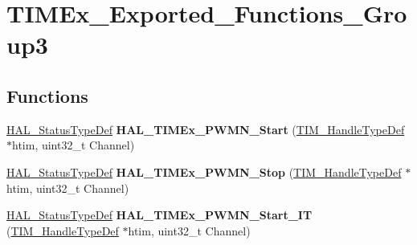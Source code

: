 \hypertarget{group___t_i_m_ex___exported___functions___group3}{}\section{T\+I\+M\+Ex\+\_\+\+Exported\+\_\+\+Functions\+\_\+\+Group3}
\label{group___t_i_m_ex___exported___functions___group3}
\subsection*{Functions}
\begin{DoxyCompactItemize}
\item 
\mbox{\label{group___t_i_m_ex___exported___functions___group3_ga4f2b0bb4b66a5acd76eac4e8d32cc498}} 
\mbox{\hyperlink{stm32f4xx__hal__def_8h_a63c0679d1cb8b8c684fbb0632743478f}{H\+A\+L\+\_\+\+Status\+Type\+Def}} {\bfseries H\+A\+L\+\_\+\+T\+I\+M\+Ex\+\_\+\+P\+W\+M\+N\+\_\+\+Start} (\mbox{\hyperlink{struct_t_i_m___handle_type_def}{T\+I\+M\+\_\+\+Handle\+Type\+Def}} $\ast$htim, uint32\+\_\+t Channel)
\item 
\mbox{\label{group___t_i_m_ex___exported___functions___group3_ga0f2e27f3fb6d8f42d998e2071e5f0482}} 
\mbox{\hyperlink{stm32f4xx__hal__def_8h_a63c0679d1cb8b8c684fbb0632743478f}{H\+A\+L\+\_\+\+Status\+Type\+Def}} {\bfseries H\+A\+L\+\_\+\+T\+I\+M\+Ex\+\_\+\+P\+W\+M\+N\+\_\+\+Stop} (\mbox{\hyperlink{struct_t_i_m___handle_type_def}{T\+I\+M\+\_\+\+Handle\+Type\+Def}} $\ast$htim, uint32\+\_\+t Channel)
\item 
\mbox{\label{group___t_i_m_ex___exported___functions___group3_ga82f0b53f6b10e6aafc6835178662c488}} 
\mbox{\hyperlink{stm32f4xx__hal__def_8h_a63c0679d1cb8b8c684fbb0632743478f}{H\+A\+L\+\_\+\+Status\+Type\+Def}} {\bfseries H\+A\+L\+\_\+\+T\+I\+M\+Ex\+\_\+\+P\+W\+M\+N\+\_\+\+Start\+\_\+\+IT} (\mbox{\hyperlink{struct_t_i_m___handle_type_def}{T\+I\+M\+\_\+\+Handle\+Type\+Def}} $\ast$htim, uint32\+\_\+t Channel)
\item 
\mbox{\label{group___t_i_m_ex___exported___functions___group3_ga13848e20df29fa552ef4f5b69fef20a6}} 

\end{DoxyCompactItemize}
